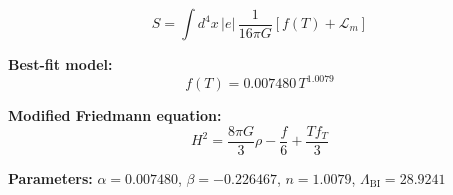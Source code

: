 
\begin{equation}
  S = \int d^4x \, |e| \, \frac{1}{16\pi G} \left[ f(T) + \mathcal{L}_m \right]
\end{equation}

\textbf{Best-fit model:}
\begin{equation}
  f(T) = 0.007480 \, T^{1.0079}
\end{equation}

\textbf{Modified Friedmann equation:}
\begin{equation}
  H^2 = \frac{8\pi G}{3} \rho - \frac{f}{6} + \frac{T f_T}{3}
\end{equation}

\textbf{Parameters:}
$\alpha = 0.007480$, \quad
$\beta = -0.226467$, \quad
$n = 1.0079$, \quad
$\Lambda_{\text{BI}} = 28.9241$